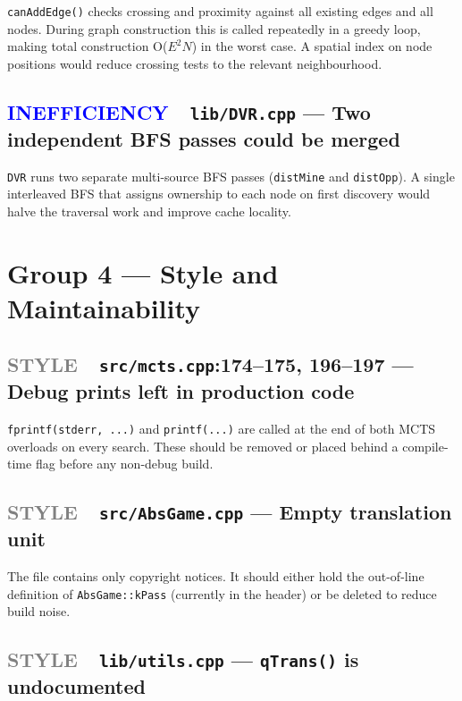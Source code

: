 \documentclass[11pt,letterpaper]{article}
\newcommand{\file}[1]{\texttt{#1}}
\newcommand{\code}[1]{\texttt{#1}}
\newcommand{\ineff}{\textcolor{blue}{\textbf{INEFFICIENCY}}}
\newcommand{\style}{\textcolor{gray}{\textbf{STYLE}}}
\begin{document}
\code{canAddEdge()} checks crossing and proximity against all existing edges
and all nodes.  During graph construction this is called repeatedly in a
greedy loop, making total construction O($E^2 N$) in the worst case.  A
spatial index on node positions would reduce crossing tests to the relevant
neighbourhood.

\subsection{\ineff\ \ \file{lib/DVR.cpp} — Two independent BFS passes could be merged}

\code{DVR} runs two separate multi-source BFS passes (\code{distMine} and
\code{distOpp}).  A single interleaved BFS that assigns ownership to each
node on first discovery would halve the traversal work and improve cache
locality.

\section{Group 4 — Style and Maintainability}

\subsection{\style\ \ \file{src/mcts.cpp}:174--175, 196--197 — Debug prints left in production code}

\code{fprintf(stderr, ...)} and \code{printf(...)} are called at the end of
both MCTS overloads on every search.  These should be removed or placed
behind a compile-time flag before any non-debug build.

\subsection{\style\ \ \file{src/AbsGame.cpp} — Empty translation unit}

The file contains only copyright notices.  It should either hold the
out-of-line definition of \code{AbsGame::kPass} (currently in the header)
or be deleted to reduce build noise.

\subsection{\style\ \ \file{lib/utils.cpp} — \code{qTrans()} is undocumented}
\end{document}
